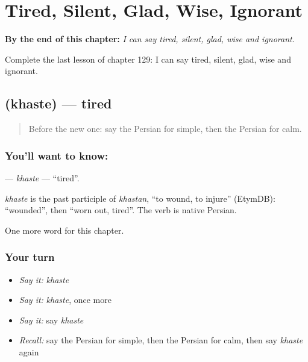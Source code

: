 
\chapter{Tired, Silent, Glad, Wise, Ignorant}
\label{ch:fa-tired-silent-glad-wise-ignorant}

\begin{chapteropening}
\textbf{By the end of this chapter:} \emph{I can say tired, silent, glad, wise and ignorant.}

Complete the last lesson of chapter 129: I can say tired, silent, glad, wise and ignorant.
\end{chapteropening}

\section[\texorpdfstring{\fa{خسته} (khaste)}{خسته (khaste)}]{ (khaste) — tired}

\label{lesson:FA-C129-khaste}



\begin{quote}
Before the new one: say the Persian for simple, then the Persian for calm.
\end{quote}

\subsection*{You'll want to know: }
\textbf{} — \emph{khaste} — \textquotedblleft{}tired\textquotedblright{}.

\begin{cousinweb}
\emph{khaste} is the past participle of \emph{khastan}, \textquotedblleft{}to wound, to injure\textquotedblright{} (EtymDB): \textquotedblleft{}wounded\textquotedblright{}, then \textquotedblleft{}worn out, tired\textquotedblright{}. The verb is native Persian.
\end{cousinweb}

\begin{grammarlens}[title={What you've built}]
One more word for this chapter.
\end{grammarlens}

\subsection*{Your turn}
\begin{itemize}
\raggedright
  \item \emph{Say it:} \emph{khaste}
  \item \emph{Say it:} \emph{khaste}, once more
  \item \emph{Say it:} say \emph{khaste}
  \item \emph{Recall:} say the Persian for simple, then the Persian for calm, then say \emph{khaste} again
\end{itemize}

